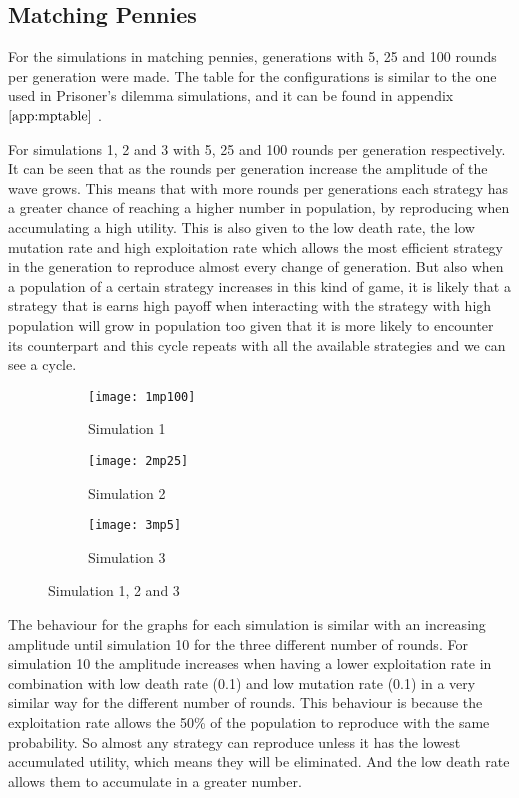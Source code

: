 \subsection{Matching Pennies}

For the simulations in matching pennies, generations with 5, 25 and 100 rounds per generation were made.  The table for the configurations is similar to the one used in Prisoner's dilemma simulations, and it can be found in appendix $\ref{app:mptable}$ .

For simulations 1, 2 and 3 with 5, 25 and 100 rounds per generation respectively. It can be seen that as the rounds per generation increase the amplitude of the wave grows. This means that with more rounds per generations each strategy has a greater chance of reaching a higher number in population, by reproducing when accumulating a high utility. This is also given to the low death rate, the low mutation rate and high exploitation rate which allows the most efficient strategy in the generation to reproduce almost every change of generation. But also when a population of a certain strategy increases in this kind of game, it is likely that a strategy that is  earns high payoff when interacting with the strategy with high population will grow in population too given that it is more likely to encounter its counterpart and this cycle repeats with all the available strategies and we can see a cycle. 

\begin{figure}[H]       
    \centering
    \begin{subfigure}[b]{0.3\textwidth}
	\centering
	{\texttt{[image: 1mp100]}}   
    	\caption{Simulation 1}
	\label{fig:mpsim1}
    \end{subfigure}
    \hfill
    \begin{subfigure}[b]{0.3\textwidth}
	\centering
	{\texttt{[image: 2mp25]}}   
    	\caption{Simulation 2}
	\label{fig:mpsim2}
    \end{subfigure}
    \hfill
    \begin{subfigure}[b]{0.3\textwidth}
	\centering
	{\texttt{[image: 3mp5]}}   
    	\caption{Simulation 3}
	\label{fig:mpsim3}
    \end{subfigure}
    \caption{Simulation 1, 2 and 3}
    \label{firstthreesimulations}
\end{figure}

The behaviour for the graphs for each simulation is similar with an increasing amplitude until simulation 10 for the three different number of rounds. For simulation 10 the amplitude increases when having a lower exploitation rate in combination with low death rate (0.1) and low mutation rate (0.1) in a very similar way for the different number of rounds. This behaviour is because the exploitation rate allows the 50\% of the population to reproduce with the same probability. So almost any strategy can reproduce unless it has the lowest accumulated utility, which means they will be eliminated. And the low death rate allows them to accumulate in a greater number.


